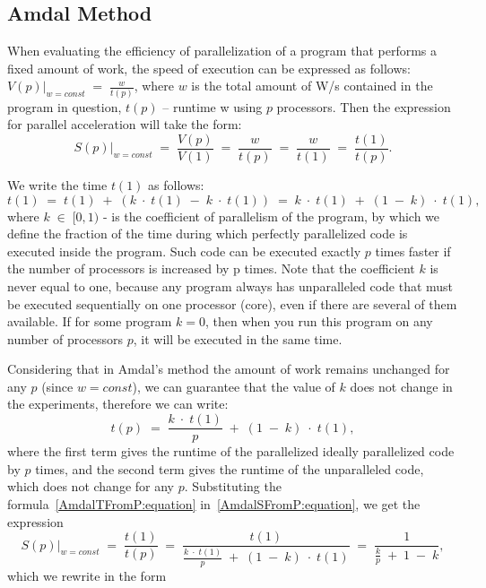 { %
	\subsection{Amdal Method}
	\par When evaluating the efficiency of parallelization of a program that performs a fixed amount of work, the speed of execution can be expressed as follows:$\left.V(p)\right|_{w=const}\;=\;\frac w{t(p)}$, where $w$  is the total amount of W/s contained in the program in question, $t(p)$ – runtime w using $ p $ processors. Then the expression for parallel acceleration will take the form:
	\begin{equation}
		\label{AmdalSFromP:equation}
		\left.S(p)\right|_{w=const}\;=\;\frac{V(p)}{V(1)}\;=\;\frac w{t(p)}\;=\;\frac w{t(1)}\;=\;\frac{t(1)}{t(p)}.
	\end{equation}
	\par We write the time $t(1)$ as follows:
	\begin{equation}
		t(1)\;=\;t(1)\;+\;(k\;\cdot\;t(1)\;-\;k\;\cdot\;t(1))\;=\;k\;\cdot\;t(1)\;+\;(1\;-\;k)\;\cdot\;t(1),
	\end{equation}
	where $k\;\in\;\lbrack0,1)$ - is the coefficient of parallelism of the program, by which we define the fraction of the time during which perfectly parallelized code is executed inside the program. Such code can be executed exactly $p$ times faster if the number of processors is increased by p times. Note that the coefficient $k$ is never equal to one, because any program always has unparalleled code that must be executed sequentially on one processor (core), even if there are several of them available. If for some program $k =0 $, then when you run this program on any number of processors $p$, it will be executed in the same time.
	\par Considering that in Amdal’s method the amount of work remains unchanged for any $p$ (since $w = const$), we can guarantee that the value of $ k $ does not change in the experiments, therefore we can write:
	\begin{equation}
		\label{AmdalTFromP:equation}
		t(p)\;=\;\frac{k\;\cdot\;t(1)}p\;+\;(1\;-\;k)\;\cdot\;t(1),
	\end{equation}
where the first term gives the runtime of the parallelized ideally parallelized code by $p$ times, and the second term gives the runtime of the unparalleled code, which does not change for any $p$. Substituting the formula~\eqref{AmdalTFromP:equation} in~\eqref{AmdalSFromP:equation}, we get the expression $$\left.S(p)\right|_{w=const}\;=\;\frac{t(1)}{t(p)}\;=\;\frac{t(1)}{{\displaystyle\frac{k\;\cdot\;t(1)}p}\;+\;(1\;-\;k)\;\cdot\;t(1)}\;=\;\frac1{{\displaystyle\frac kp}\;+\;1\;-\;k},$$ which we rewrite in the form
}
